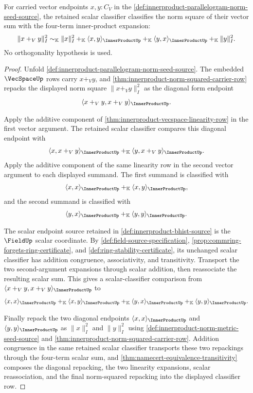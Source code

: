 \begin{theorem}
\label{thm:innerproduct-norm-of-sum-expansion-row}
For carried vector endpoints $x,y:C_V$ in the
\autoref{def:innerproduct-parallelogram-norm-seed-source}, the retained scalar
classifier classifies the norm square of their vector sum with the four-term
inner-product expansion:
$$
\|x+_V y\|_{I}^{2}
\sim_{\mathbb{K}}
\|x\|_{I}^{2}
+_{\mathbb{K}}
\langle x,y\rangle_{\InnerProductUp}
+_{\mathbb{K}}
\langle y,x\rangle_{\InnerProductUp}
+_{\mathbb{K}}
\|y\|_{I}^{2}.
$$
No orthogonality hypothesis is used.
\end{theorem}
\begin{proof}
Unfold \autoref{def:innerproduct-parallelogram-norm-seed-source}. The
embedded $\VecSpaceUp$ rows carry $x+_V y$, and
\autoref{thm:innerproduct-norm-squared-carrier-row} repacks the displayed norm
square $\|x+_V y\|_{I}^{2}$ as the diagonal form endpoint
$$
\langle x+_V y,x+_V y\rangle_{\InnerProductUp}.
$$

Apply the additive component of
\autoref{thm:innerproduct-vecspace-linearity-row} in the first vector argument.
The retained scalar classifier compares this diagonal endpoint with
$$
\langle x,x+_V y\rangle_{\InnerProductUp}
+_{\mathbb{K}}
\langle y,x+_V y\rangle_{\InnerProductUp}.
$$
Apply the additive component of the same linearity row in the second vector
argument to each displayed summand. The first summand is classified with
$$
\langle x,x\rangle_{\InnerProductUp}
+_{\mathbb{K}}
\langle x,y\rangle_{\InnerProductUp},
$$
and the second summand is classified with
$$
\langle y,x\rangle_{\InnerProductUp}
+_{\mathbb{K}}
\langle y,y\rangle_{\InnerProductUp}.
$$

The scalar endpoint source retained in \autoref{def:innerproduct-bhist-source}
is the $\FieldUp$ scalar coordinate. By
\autoref{def:field-source-specification},
\autoref{prop:commring-forgets-ring-certificate}, and
\autoref{def:ring-stability-certificate}, its unchanged scalar classifier has
addition congruence, associativity, and transitivity. Transport the two
second-argument expansions through scalar addition, then reassociate the
resulting scalar sum. This gives a scalar-classifier comparison from
$\langle x+_V y,x+_V y\rangle_{\InnerProductUp}$ to
$$
\langle x,x\rangle_{\InnerProductUp}
+_{\mathbb{K}}
\langle x,y\rangle_{\InnerProductUp}
+_{\mathbb{K}}
\langle y,x\rangle_{\InnerProductUp}
+_{\mathbb{K}}
\langle y,y\rangle_{\InnerProductUp}.
$$

Finally repack the two diagonal endpoints
$\langle x,x\rangle_{\InnerProductUp}$ and
$\langle y,y\rangle_{\InnerProductUp}$ as $\|x\|_{I}^{2}$ and
$\|y\|_{I}^{2}$ using \autoref{def:innerproduct-norm-metric-seed-source} and
\autoref{thm:innerproduct-norm-squared-carrier-row}. Addition congruence in
the same retained scalar classifier transports these two repackings through
the four-term scalar sum, and \autoref{thm:namecert-equivalence-transitivity}
composes the diagonal repacking, the two linearity expansions, scalar
reassociation, and the final norm-squared repacking into the displayed
classifier row.
\end{proof}
